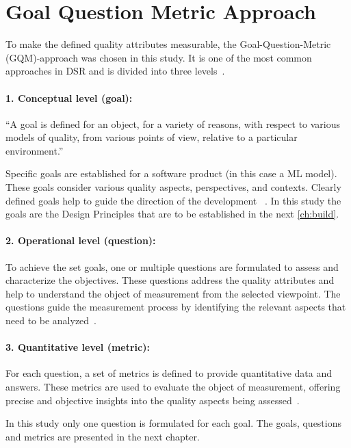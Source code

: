 \section{Goal Question Metric Approach}\label{sec:goal-question-metric-approach}
To make the defined quality attributes measurable, the Goal-Question-Metric (\ac{GQM})-approach was chosen in this
study.
It is one of the most common approaches in DSR and is divided into three levels~\cite[p. 3]{van2002goal}.

\paragraph{1. Conceptual level (goal):}
``A goal is defined for an object, for a variety of reasons,
with respect to various models of quality, from various points of view, relative to a
particular environment.''
~\cite[p. 3]{van2002goal}

Specific goals are established for a software product (in this case a \ac{ML} model).
These goals consider various quality aspects, perspectives, and contexts.
Clearly defined goals help to guide the direction of the development
~\cite[p. 3]{van2002goal}.
In this study the goals are the Design Principles that are to be established in the next \cref{ch:build}.

\paragraph{2. Operational level (question):}
To achieve the set goals, one or multiple questions are formulated to assess and characterize the objectives.
These questions address the quality attributes and help to understand the object of measurement from the selected
viewpoint.
The questions guide the measurement process by identifying the relevant aspects that need to be
analyzed~\cite[p. 3]{van2002goal}.

\paragraph{3. Quantitative level (metric):}
For each question, a set of metrics is defined to provide quantitative data and answers.
These metrics are used to evaluate the object of measurement, offering precise and objective insights into the
quality aspects being assessed~\cite[p. 3]{van2002goal}.

In this study only one question is formulated for each goal.
The goals, questions and metrics are presented in the next chapter.
